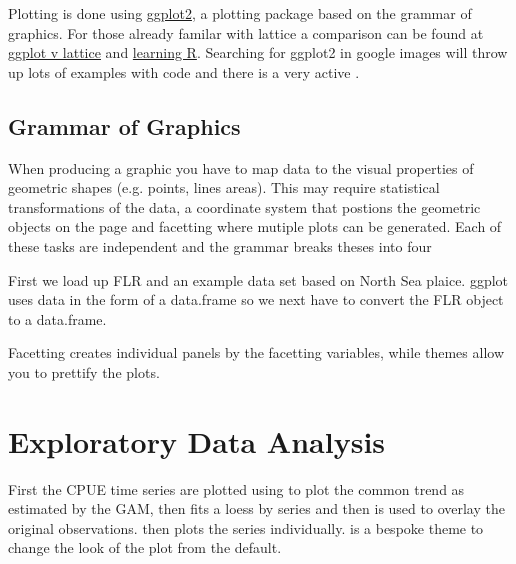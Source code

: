 \documentclass[shortnames,nojss,article]{jss}
\begin{document}
Plotting is done using \hyperref[http://had.co.nz/ggplot2/]{ggplot2}, a plotting package based on the grammar of graphics. For those already familar with lattice a comparison can be found at \hyperref[http://had.co.nz/ggplot/vs-lattice.html]{ggplot v lattice} and \hyperref[http://learnr.wordpress.com/2009/06/28/ggplot2-version-of-figures-in-lattice-multivariate-data-visualization-with-r-part-1/]{learning R}. Searching for ggplot2 in google images will throw up lots of examples with code and there is a very active \href{users mailing list}{}.

\subsection[gg]{Grammar of Graphics}

When producing a graphic you have to map data to the visual properties of geometric shapes (e.g. points, lines areas). This
may require statistical transformations of the data, a coordinate system that postions the geometric objects on the page
and facetting where mutiple plots can be generated. Each of these tasks are independent and the grammar breaks theses into four 

First we load up FLR and an example data set based on North Sea plaice. ggplot uses data in the form of a data.frame so we 
next have to convert the FLR object to a data.frame. 

Facetting creates individual panels by the facetting variables, while themes allow you to prettify the plots. 


\clearpage
\section{Exploratory Data Analysis}

First the CPUE time series are plotted using  to plot the common trend as estimated by the GAM,
then  fits a loess by series and then  is used to overlay the original observations.  then plots the series individually.  is a bespoke theme to change the look of the plot from the default.
\end{document}
